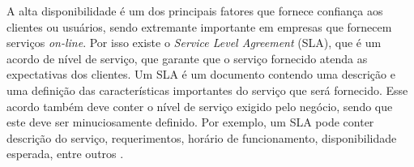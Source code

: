 A alta disponibilidade é um dos principais fatores que fornece confiança aos clientes ou usuários, sendo extremante importante em empresas 
que fornecem serviços \textit{on-line}. Por isso existe o \textit{Service Level Agreement} (SLA), que é um acordo de nível de serviço, 
que garante que o serviço fornecido atenda as expectativas dos clientes. Um SLA é um documento contendo uma descrição e uma definição 
das características importantes do serviço que será fornecido. Esse acordo também deve conter o nível de serviço exigido pelo negócio, 
sendo que este deve ser minuciosamente definido. Por exemplo, um SLA pode conter descrição do serviço, requerimentos, horário de funcionamento,
disponibilidade esperada, entre outros \cite{smith2010}.

